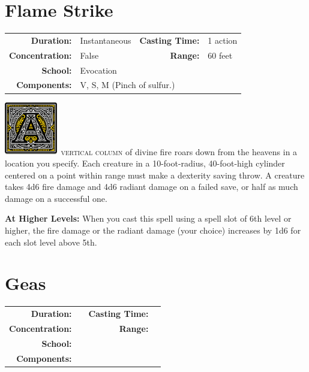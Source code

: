 \documentclass[12pt,showtrims]{memoir}
\begin{document}
\section*{Flame Strike}

{
\small\centering\vspace{-6pt}
\begin{tabular}{rlrl}
\toprule

\textbf{Duration:} & Instantaneous &
\textbf{Casting Time:} & 1 action \\
\textbf{Concentration:} & False &
\textbf{Range:} & 60 feet \\
\textbf{School:} & Evocation \\
\textbf{Components:} & \multicolumn{3}{p{0.7\textwidth}}{V, S, M (Pinch of sulfur.)}\\

\bottomrule
\end{tabular}
}

\vspace{1\baselineskip}\noindent
\lettrine[lines=4]{\includegraphics[height=66pt]{initials/A.png}}{\ vertical column} of divine fire roars down from the heavens in a location you specify. Each creature in a 10-foot-radius, 40-foot-high cylinder centered on a point within range must make a dexterity saving throw. A creature takes 4d6 fire damage and 4d6 radiant damage on a failed save, or half as much damage on a successful one.

\vspace{8pt} \noindent\textbf{At Higher Levels:} When you cast this spell using a spell slot of 6th level or higher, the fire damage or the radiant damage (your choice) increases by 1d6 for each slot level above 5th.
\newpage
\section*{Geas}
{
\small\centering\vspace{-6pt}
\begin{tabular}{rlrl}
\toprule

\textbf{Duration:} &  &
\textbf{Casting Time:} &  \\
\textbf{Concentration:} & &
\textbf{Range:} &  \\
\textbf{School:} &  \\
\textbf{Components:} & \multicolumn{3}{p{0.7\textwidth}}{}\\

\bottomrule
\end{tabular}
}
\newpage
\end{document}
